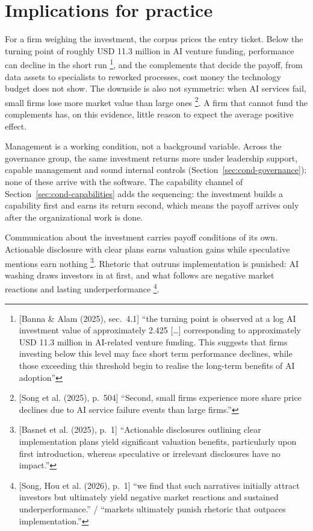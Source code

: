 \section{Implications for practice}
\label{sec:disc-practice}

For a firm weighing the investment, the corpus prices the entry ticket. Below the
turning point of roughly USD 11.3 million in AI venture funding, performance can
decline in the short run \parencite[sec.~4.1]{banna2025value}\footnote{[Banna \& Alam (2025),
sec.~4.1] ``the turning point is observed at a log AI investment value of approximately
2.425 [\dots] corresponding to approximately USD 11.3 million in AI-related venture
funding. This suggests that firms investing below this level may face short term
performance declines, while those exceeding this threshold begin to realise the
long-term benefits of AI adoption''}, and the complements that decide the payoff, from data assets to
specialists to reworked processes, cost money the technology budget does not show. The
downside is also not symmetric: when AI services fail, small firms lose more market
value than large ones \parencite[p.~504]{song2025companies}\footnote{[Song et al.
(2025), p.~504] ``Second, small firms experience more share price declines due to AI
service failure events than large firms.''}. A firm that cannot fund the complements
has, on this evidence, little reason to expect the average positive effect.

Management is a working condition, not a background variable. Across the governance
group, the same investment returns more under leadership support, capable management
and sound internal controls (Section~\ref{sec:cond-governance}); none of these arrive
with the software. The capability channel of Section~\ref{sec:cond-capabilities} adds
the sequencing: the investment builds a capability first and earns its return second,
which means the payoff arrives only after the organizational work is done.

Communication about the investment carries payoff conditions of its own. Actionable
disclosure with clear plans earns valuation gains while speculative mentions earn
nothing \parencite[p.~1]{basnet2025analyzing}\footnote{[Basnet et al. (2025), p.~1]
``Actionable disclosures outlining clear implementation plans yield significant
valuation benefits, particularly upon first introduction, whereas speculative or
irrelevant disclosures have no impact.''}. Rhetoric that outruns implementation is
punished: AI washing draws investors in at first, and what follows are negative market
reactions and lasting underperformance \parencite[p.~1]{song2026washing}\footnote{[Song, Hou et al. (2026), p.~1] ``we
find that such narratives initially attract investors but ultimately yield negative
market reactions and sustained underperformance.'' / ``markets ultimately punish
rhetoric that outpaces implementation.''}.

